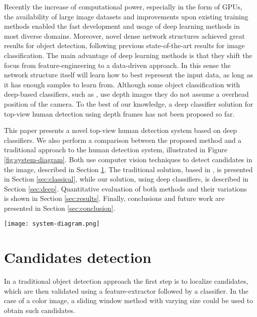   Recently the increase of computational power, especially in the form of GPUs, the availability of large image datasets and improvements upon existing training methods \cite{nair2010relu} enabled the fast development and usage of deep learning methods in most diverse domains. Moreover, novel dense network structures \cite{NIPS2013_5207} achieved great results for object detection, following previous state-of-the-art results \cite{hintonCONVNET} for image classification. The main advantage of deep learning methods is that they shift the focus from feature-engineering to a data-driven approach. In this sense the network structure itself will learn how to best represent the input data, as long as it has enough samples to learn from. Although some object classification with deep-based classifiers, such as \cite{thornberg2015combining}, use depth images they do not assume a overhead position of the camera. To the best of our knowledge, a deep classifier solution for top-view human detection using depth frames has not been proposed so far.

  This paper presents a novel top-view human detection system based on deep classifiers. We also perform a comparison between the proposed method and a traditional approach to the human detection system, illustrated in Figure \ref{fig:system-diagram}. Both use computer vision techniques to detect candidates in the image, described in Section \ref{sec:candidates}. The traditional solution, based in \cite{rauter}, is presented in Section \ref{sec:classical}, while our solution, using deep classifiers, is described in Section \ref{sec:deep}. Quantitative evaluation of both methods and their variations is shown in Section \ref{sec:results}. Finally, conclusions and future work are presented in Section \ref{sec:conclusion}.

  \begin{figure*}[!t]
  \centering
  \texttt{[image: system-diagram.png]}
  \caption{Human detection system diagram. Two candidates are detected on the input frame.  }
  \label{fig:system-diagram}
  \end{figure*}

\section{Candidates detection}
\label{sec:candidates}

    In a traditional object detection approach \cite{traditional-objdetect} the first step is to localize candidates, which are then validated using a feature-extractor followed by a classifier. In the case of a color image, a sliding window method with varying size could be used to obtain such candidates.

